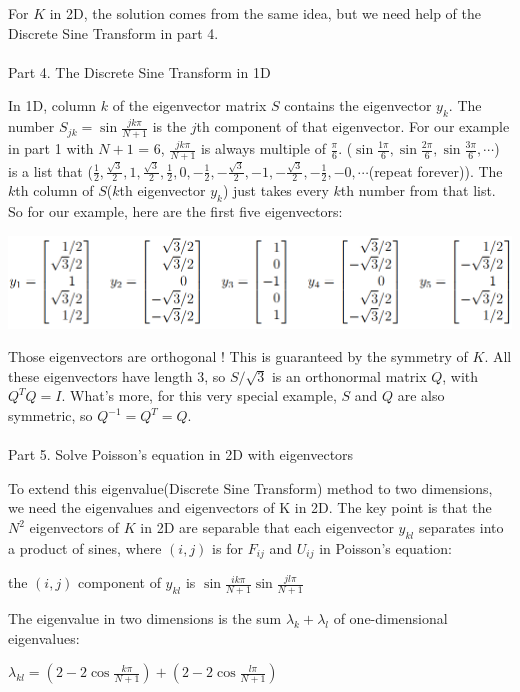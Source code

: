 \documentclass{article}
\newenvironment{nscenter}
{\parskip=0pt\par\nopagebreak\centering}
{\par\noindent\ignorespacesafterend}
\begin{document}
\begin{spacing}{1.5}
For $K$ in 2D, the solution comes from the same idea, but we need help of the Discrete Sine Transform in part 4.
\\\\Part 4. The Discrete Sine Transform in 1D

In 1D, column $k$ of the eigenvector matrix $S$ contains the eigenvector $y_k$. The number $S_{jk}=\sin \frac{jk\pi}{N+1}$ is the $j$th component of that eigenvector. For our example in part 1 with $N +1$ = 6, $\frac{jk\pi}{N+1}$ is always multiple of $\frac{\pi}{6}$. ($\sin \frac{1\pi}{6}, \sin \frac{2\pi}{6}, \sin \frac{3\pi}{6}, \cdots$) is a list that ($\frac{1}{2}, \frac{\sqrt{3}}{2}, 1, \frac{\sqrt{3}}{2}, \frac{1}{2}, 0, -\frac{1}{2}, -\frac{\sqrt{3}}{2}, -1, -\frac{\sqrt{3}}{2}, -\frac{1}{2}, -0, \cdots$(repeat forever)).
The $k$th column of $S$($k$th eigenvector $y_k$) just takes every $k$th number from that list. So for our example, here are the first five eigenvectors:
\\\begin{nscenter}
	\includegraphics[width=1\textwidth]{discrete_sine_transform_eigenvectors.png} \\ 
\end{nscenter}

Those eigenvectors are orthogonal ! This is guaranteed by the symmetry of $K$. All
these eigenvectors have length 3, so $S/\sqrt{3}$ is an orthonormal matrix $Q$, with $Q^TQ = I$. What's more, for this very special example, $S$ and $Q$ are also symmetric, so $Q^{-1}=Q^T=Q$.
\\\\ Part 5. Solve Poisson's equation in 2D with eigenvectors

To extend this eigenvalue(Discrete Sine Transform) method to two dimensions, we need the eigenvalues and eigenvectors of K in 2D. The key point is that the $N^2$ eigenvectors of $K$ in 2D are separable that each eigenvector $y_{kl}$ separates into a product of sines, where $(i ,j)$ is for $F_{ij}$ and $U_{ij}$ in Poisson's equation:
\begin{nscenter}
	the $(i, j)$ component of $y_{kl}$ is $\sin \frac{ik\pi}{N+1} \sin \frac{jl\pi}{N+1}$
\end{nscenter}
The eigenvalue in two dimensions is the sum $\lambda_k + \lambda_l$ of one-dimensional eigenvalues:
\begin{nscenter}
	 $\lambda_{kl}=(2-2\cos \frac{k\pi}{N+1}) + (2- 2\cos \frac{l\pi}{N+1})$
\end{nscenter}


\end{spacing}
\end{document}
